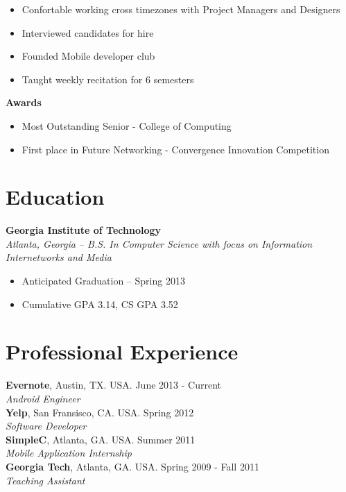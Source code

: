 \documentclass[margin,line]{res}
\begin{document}
\begin{resume}
\begin{itemize}
    \item Confortable working cross timezones with Project Managers and Designers 
    \item Interviewed candidates for hire
    \item Founded Mobile developer club
    \item Taught weekly recitation for 6 semesters
    \end{itemize}
 {\bf Awards}
    \begin{itemize}
    \item Most Outstanding Senior - College of Computing
    \item First place in Future Networking - Convergence Innovation Competition
    \end{itemize}
\section{\sc Education}
    {\bf Georgia Institute of Technology}\\
    {\em Atlanta, Georgia -- B.S. In Computer Science with focus on
      Information Internetworks and Media}
    \begin{itemize}
    \item Anticipated Graduation -- Spring 2013
    \item Cumulative GPA 3.14, CS GPA 3.52
    \end{itemize}

\section{\sc Professional Experience}
    {\bf Evernote}, Austin, TX. USA. \hfill{June 2013 - Current}\\
    {\em Android Engineer} \\
    {\bf Yelp}, San Fransisco, CA. USA. \hfill{Spring 2012}\\
    {\em Software Developer}\hfill\\
    {\bf SimpleC}, Atlanta, GA. USA. \hfill{Summer 2011}\\
    {\em Mobile Application Internship} \\
    {\bf Georgia Tech}, Atlanta, GA. USA. \hfill{Spring 2009 - Fall 2011}\\
    {\em Teaching Assistant} \\

\end{resume}
\end{document}
